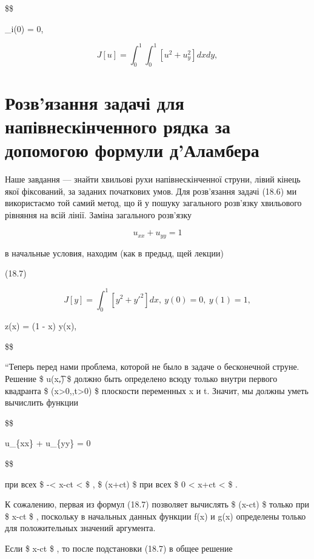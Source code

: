 \documentclass[
  ukrainian,
]{article}
\begin{document}
\$\$

\varphi\_i(0) = 0,

\[ J[u] = \int_{0}^{1} \int_{0}^{1} [u^{2} + u^{2}_{y}] dx dy,
\]

\section{Розв'язання задачі для напівнескінченного рядка за допомогою
формули
д'Аламбера}\label{ux440ux43eux437ux432ux44fux437ux430ux43dux43dux44f-ux437ux430ux434ux430ux447ux456-ux434ux43bux44f-ux43dux430ux43fux456ux432ux43dux435ux441ux43aux456ux43dux447ux435ux43dux43dux43eux433ux43e-ux440ux44fux434ux43aux430-ux437ux430-ux434ux43eux43fux43eux43cux43eux433ux43eux44e-ux444ux43eux440ux43cux443ux43bux438-ux434ux430ux43bux430ux43cux431ux435ux440ux430}

Наше завдання --- знайти хвильові рухи напівнескінченної струни, лівий
кінець якої фіксований, за заданих початкових умов. Для розв'язання
задачі (18.6) ми використаємо той самий метод, що й у пошуку загального
розв'язку хвильового рівняння на всій лінії. Заміна загального розв'язку

\[ u_{xx} + u_{yy} = 1
\]

в начальные условия, находим (как в предыд, щей лекции)

(18.7)

\[ J[y] = \int_{0}^{1} [y^{2} + {y'}^{2}] dx, \ y(0) = 0, \ y(1) = 1,
\]

z(x) = (1 - x) y(x),

\$\$

``Теперь перед нами проблема, которой не было в задаче о бесконечной
струне. Решение \$ u\left(x,\t\right) \$ должно быть определено всюду
только внутри первого квадранта \$ (x\textgreater0,,t\textgreater0) \$
плоскости переменных x и t. Значит, мы должны уметь вычислить функции

\$\$

u\_\{xx\} + u\_\{yy\} = 0

\$\$

при всех \$ -\infty \textless{} x-ct \textless{} \infty \$ , \$
\psi(x+ct) \$ при всех \$ 0 \textless{} x+ct \textless{} \infty \$ .

К сожалению, первая из формул (18.7) позволяет вычислять \$
\varphi(x-ct) \$ только при \$ x-ct \$ , поскольку в
начальных данных функции f(x) и g(x) определены только для положительных
значений аргумента.

Если \$ x-ct  \$ , то после подстановки (18.7) в общее
решение
\end{document}
